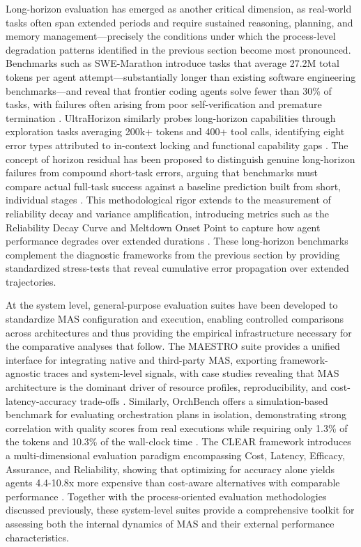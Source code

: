 \documentclass[11pt]{article}
\begin{document}
Long-horizon evaluation has emerged as another critical dimension, as real-world tasks often span extended periods and require sustained reasoning, planning, and memory management---precisely the conditions under which the process-level degradation patterns identified in the previous section become most pronounced. Benchmarks such as SWE-Marathon introduce tasks that average 27.2M total tokens per agent attempt---substantially longer than existing software engineering benchmarks---and reveal that frontier coding agents solve fewer than 30\% of tasks, with failures often arising from poor self-verification and premature termination \cite{ref349}. UltraHorizon similarly probes long-horizon capabilities through exploration tasks averaging 200k+ tokens and 400+ tool calls, identifying eight error types attributed to in-context locking and functional capability gaps \cite{ref350}. The concept of horizon residual has been proposed to distinguish genuine long-horizon failures from compound short-task errors, arguing that benchmarks must compare actual full-task success against a baseline prediction built from short, individual stages \cite{ref351}. This methodological rigor extends to the measurement of reliability decay and variance amplification, introducing metrics such as the Reliability Decay Curve and Meltdown Onset Point to capture how agent performance degrades over extended durations \cite{ref352,ref353}. These long-horizon benchmarks complement the diagnostic frameworks from the previous section by providing standardized stress-tests that reveal cumulative error propagation over extended trajectories.

At the system level, general-purpose evaluation suites have been developed to standardize MAS configuration and execution, enabling controlled comparisons across architectures and thus providing the empirical infrastructure necessary for the comparative analyses that follow. The MAESTRO suite provides a unified interface for integrating native and third-party MAS, exporting framework-agnostic traces and system-level signals, with case studies revealing that MAS architecture is the dominant driver of resource profiles, reproducibility, and cost-latency-accuracy trade-offs \cite{ref354}. Similarly, OrchBench offers a simulation-based benchmark for evaluating orchestration plans in isolation, demonstrating strong correlation with quality scores from real executions while requiring only 1.3\% of the tokens and 10.3\% of the wall-clock time \cite{ref355}. The CLEAR framework introduces a multi-dimensional evaluation paradigm encompassing Cost, Latency, Efficacy, Assurance, and Reliability, showing that optimizing for accuracy alone yields agents 4.4-10.8x more expensive than cost-aware alternatives with comparable performance \cite{ref356}. Together with the process-oriented evaluation methodologies discussed previously, these system-level suites provide a comprehensive toolkit for assessing both the internal dynamics of MAS and their external performance characteristics.
\end{document}
